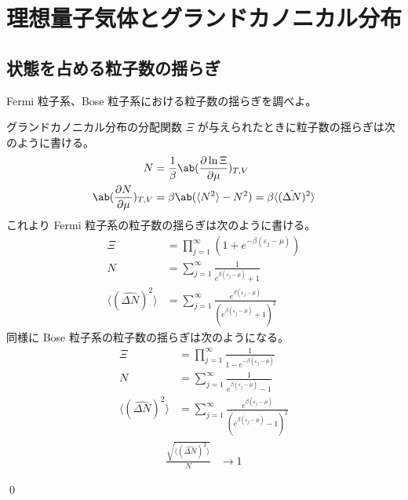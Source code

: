 \documentclass[uplatex,dvipdfmx,a4paper,11pt]{jlreq}
\makeatletter
\theoremstyle{definition}
\renewenvironment{proof}[1][\proofname]{\par
  \normalfont
  \topsep6\p@\@plus6\p@ \trivlist
  \item[\hskip\labelsep{\bfseries #1}\@addpunct{\bfseries}]\ignorespaces\quad\par
}{%
  \qed\endtrivlist\@endpefalse
}
\renewcommand\proofname{証明}
\makeatother
\begin{document}
\section{理想量子気体とグランドカノニカル分布}
\setcounter{subsection}{5}
\subsection{状態を占める粒子数の揺らぎ}
\begin{problem}
Fermi 粒子系、Bose 粒子系における粒子数の揺らぎを調べよ。
\end{problem}
\begin{proof}
  グランドカノニカル分布の分配関数 $\Xi$ が与えられたときに粒子数の揺らぎは次のように書ける。
  \begin{align}
    N                         & = \frac{1}{\beta}\ab(\diffp{\ln\Xi}{\mu})_{T,V}                              \\
    \ab(\diffp{N}{\mu})_{T,V} & = \beta\ab(\langle N^2\rangle - N^2) = \beta\langle(\hat{\Delta N})^2\rangle
  \end{align}
  これより Fermi 粒子系の粒子数の揺らぎは次のように書ける。
  \begin{align}
    \Xi                              & = \prod_{j=1}^{\infty}(1 + e^{-\beta(\varepsilon_j - \mu)})                                        \\
    N                                & = \sum_{j=1}^{\infty}\frac{1}{e^{\beta(\varepsilon_j - \mu)} + 1}                                  \\
    \langle(\hat{\Delta N})^2\rangle & = \sum_{j=1}^{\infty}\frac{e^{\beta(\varepsilon_j - \mu)}}{(e^{\beta(\varepsilon_j - \mu)} + 1)^2}
  \end{align}
  同様に Bose 粒子系の粒子数の揺らぎは次のようになる。
  \begin{align}
    \Xi                              & = \prod_{j=1}^{\infty}\frac{1}{1 - e^{-\beta(\varepsilon_j - \mu)}}                                \\
    N                                & = \sum_{j=1}^{\infty}\frac{1}{e^{\beta(\varepsilon_j - \mu)} - 1}                                  \\
    \langle(\hat{\Delta N})^2\rangle & = \sum_{j=1}^{\infty}\frac{e^{\beta(\varepsilon_j - \mu)}}{(e^{\beta(\varepsilon_j - \mu)} - 1)^2}
  \end{align}
  \begin{align}
    \frac{\sqrt{\langle(\hat{\Delta N})^2\rangle}}{N} & \to 1
  \end{align}

\end{proof}
\end{document}
